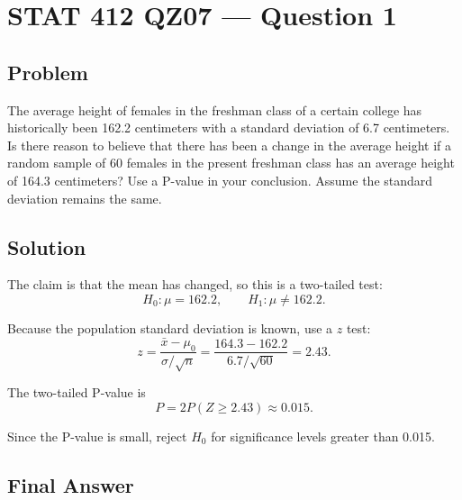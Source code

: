 \documentclass[11pt]{article}
\begin{document}
\section*{STAT 412 QZ07 --- Question 1}

\subsection*{Problem}

The average height of females in the freshman class of a certain college has historically been 162.2 centimeters with a standard deviation of 6.7 centimeters. Is there reason to believe that there has been a change in the average height if a random sample of 60 females in the present freshman class has an average height of 164.3 centimeters? Use a P-value in your conclusion. Assume the standard deviation remains the same.

\subsection*{Solution}

The claim is that the mean has changed, so this is a two-tailed test:
\[
H_0:\mu=162.2,\qquad H_1:\mu\ne162.2.
\]

Because the population standard deviation is known, use a $z$ test:
\[
z=\frac{\bar{x}-\mu_0}{\sigma/\sqrt{n}}
=\frac{164.3-162.2}{6.7/\sqrt{60}}
=2.43.
\]

The two-tailed P-value is
\[
P=2P(Z\ge 2.43)\approx 0.015.
\]

Since the P-value is small, reject $H_0$ for significance levels greater than 0.015.

\subsection*{Final Answer}

\end{document}
